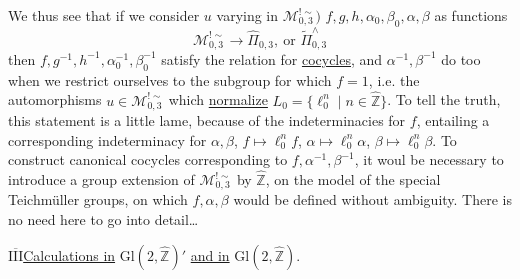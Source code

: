 We thus see that if we consider  $u$ varying in $\mathcal M_{0,3}^{!\sim})$ $f,g,h,\alpha_0,\beta_0,\alpha,\beta$ as functions
\[
\mathcal M_{0,3}^{!\sim}\longrightarrow\widehat{\Pi}_{0,3},\ \text{or }\widetilde{\Pi}_{0,3}^{\wedge}
\]
then $f,g^{-1},h^{-1},\alpha_0^{-1},\beta_0^{-1}$ satisfy the relation for \uline{cocycles}, and $\alpha^{-1},\beta^{-1}$ do too when we restrict ourselves to the subgroup for which $f=1$, i.e. the automorphisms $u\in\mathcal M_{0,3}^{!\sim}$ which \uline{normalize}  $L_0=\{\ell_0^n\mid n\in\widehat{\mathbb Z}\}$. To tell the truth, this statement  is a little lame, because of the indeterminacies for $f$, entailing a corresponding indeterminacy for $\alpha,\beta$, $f\mapsto\ell_0^n f$, $\alpha\mapsto\ell_0^n\alpha$, $\beta\mapsto\ell_0^n\beta$. To construct canonical cocycles corresponding to $f,\alpha^{-1},\beta^{-1}$, it woul be necessary to introduce a group extension of $\mathcal M_{0,3}^{!\sim}$ by $\widehat{\mathbb Z}$, on the model of the special Teichmüller groups, on which $f,\alpha,\beta$ would be defined without ambiguity. There is no need here to go into detail\ldots


\uline{$\overline{\mathrm{III}}$}\quad \uline{Calculations in} $\mathrm{Gl}(2,\widehat{\mathbb Z})'$ \uline{and in} $\mathrm{Gl}(2,\widehat{\mathbb Z})$.

